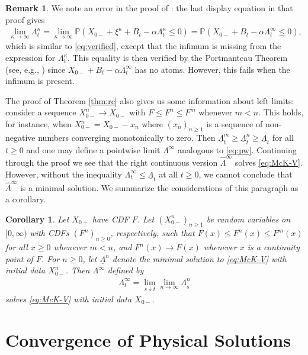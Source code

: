 \documentclass[12pt]{amsart}
\newcommand{\wh}{\widehat}
\newcommand{\ubar}{\underline}
\newcommand{\bP}{\mathbb{P}}
\theoremstyle{plain}
\newtheorem{coro}[thm]{Corollary}
\theoremstyle{definition}
\newtheorem{rmk}[thm]{Remark}
\begin{document}
\begin{rmk}\label{rmk:error}
We note an error in the proof of \cite[Proposition 5.1]{hambly_mckean-vlasov_2022}: the last display equation in that proof gives
\begin{align}
\lim_{\kappa\to \infty}\Lambda^\kappa_t=\lim_{\kappa\to \infty}\bP (X_{0-}+\xi^\kappa +B_t-\alpha\Lambda^\kappa_t\le 0)=\bP (X_{0-}+B_t-\alpha\Lambda^\infty_t\le 0),
\end{align}
which is similar to \eqref{eq:verified}, except that the infimum is missing from the expression for $\Lambda^\kappa_t$. This equality is then verified by the Portmanteau Theorem (see, e.g., \cite[11.1.1]{dudley_real_2002}) since $X_{0-}+B_t-\alpha\Lambda^\infty_t$ has no atoms. However, this fails when the infimum is present. 
\end{rmk}

The proof of Theorem \ref{thm:rc} also gives us some information about left limits: consider a sequence $X^n_{0-}\to X_{0-}$ with $F\le F^n\le F^m$ whenever $m<n$. This holds, for instance, when $X^n_{0-}=X_{0-}-x_n$ where $(x_n)_{n\ge 1}$ is a sequence of non-negative numbers converging monotonically to zero. Then $\ubar{\Lambda}^m_t\ge \ubar{\Lambda}^n_t \ge \ubar{\Lambda}_t$ for all $t\ge 0$ and one may define a pointwise limit $\Lambda^\infty$ analogous to \eqref{eq:pw}. Continuing through the proof we see that the right continuous version $\wh\Lambda^\infty$ solves \eqref{eq:McK-V}. However, without the inequality $\Lambda^\infty_t\le \ubar{\Lambda}_t$ at all $t\ge 0$, we cannot conclude that $\wh\Lambda^\infty$ is a minimal solution. We summarize the considerations of this paragraph as a corollary. 
\begin{coro}\label{coro:ll}
Let $X_{0-}$ have CDF $F$. Let $(X_{0-}^n)_{n\ge 1}$ be random variables on $[0,\infty)$ with CDFs $(F^n)_{n\ge 0}$, respectively, such that $F(x) \le F^n(x)\le F^m(x)$ for all $x\ge 0$ whenever $m<n$, and $F^n(x)\to F(x)$ whenever $x$ is a continuity point of $F$. For $n\ge0$, let $\ubar{\Lambda}^n$ denote the minimal solution to \eqref{eq:McK-V} with initial data $X_{0-}^n$. Then $\Lambda^{\infty}$ defined by
\begin{align}
\Lambda^\infty_t = \lim_{s\downarrow t}\lim_{n\to\infty}\ubar{\Lambda}^n_s
\end{align}
solves \eqref{eq:McK-V} with initial data $X_{0-}$.
\end{coro}

\section{Convergence of Physical Solutions}\label{sec:phys}
\end{document}
